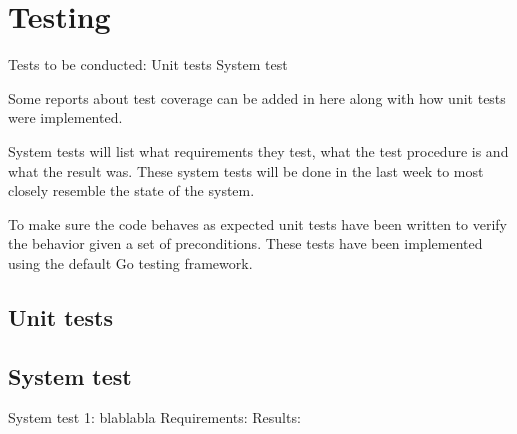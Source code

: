 \chapter{Testing}
Tests to be conducted:
Unit tests
System test

Some reports about test coverage can be added in here along with how unit tests were implemented.

System tests will list what requirements they test, what the test procedure is and what the result was.
These system tests will be done in the last week to most closely resemble the state of the system.

To make sure the code behaves as expected unit tests have been written to verify the behavior given a set of preconditions.
These tests have been implemented using the default Go testing framework.

\section{Unit tests}

\section{System test}

System test 1:
blablabla
Requirements:
Results:
